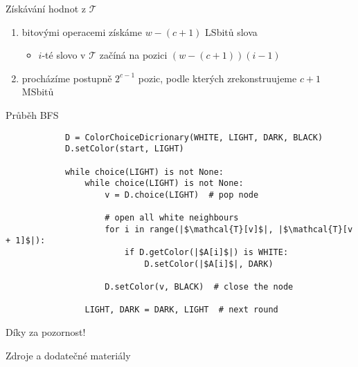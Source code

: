 \documentclass{beamer}
\begin{document}
	\begin{frame}{Získávání hodnot z $\mathcal{T}$}
		\begin{enumerate}
			\item bitovými operacemi získáme $w - (c + 1)$ LSbitů slova
			\begin{itemize}
				\item $i$-té slovo v $\mathcal{T}$ začíná na pozici $(w - (c + 1))(i - 1)$
			\end{itemize}
			\item procházíme postupně $2^{c - 1}$ pozic, podle kterých zrekonstruujeme $c + 1$ MSbitů
		\end{enumerate}
	\end{frame}


	\begin{frame}[fragile]{Průběh BFS}
		\small
		\begin{verbatim}
			D = ColorChoiceDicrionary(WHITE, LIGHT, DARK, BLACK)
			D.setColor(start, LIGHT)

			while choice(LIGHT) is not None:
				while choice(LIGHT) is not None:
					v = D.choice(LIGHT)  # pop node

					# open all white neighbours
					for i in range(|$\mathcal{T}[v]$|, |$\mathcal{T}[v + 1]$|):
						if D.getColor(|$A[i]$|) is WHITE:
							D.setColor(|$A[i]$|, DARK)

					D.setColor(v, BLACK)  # close the node

				LIGHT, DARK = DARK, LIGHT  # next round
		\end{verbatim}
	\end{frame}

	\begin{frame}[focus]
		Díky za pozornost!
	\end{frame}
	
	\appendix
	\begin{frame}{Zdroje a dodatečné materiály}
		\nocite{*}
		
		
	\end{frame}
\end{document}
